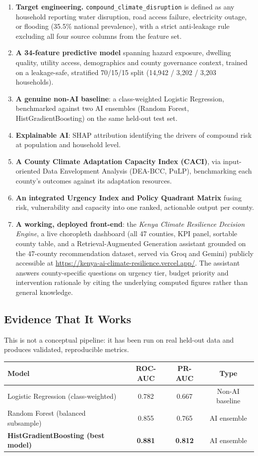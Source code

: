 \documentclass[12pt,a4paper]{article}
\begin{document}
\begin{enumerate}[leftmargin=1.2em, itemsep=1pt]
\item \textbf{Target engineering.} \texttt{compound\_climate\_disruption} is defined as any household reporting water disruption, road access failure, electricity outage, or flooding (35.5\% national prevalence), with a strict anti-leakage rule excluding all four source columns from the feature set.
\item \textbf{A 34-feature predictive model} spanning hazard exposure, dwelling quality, utility access, demographics and county governance context, trained on a leakage-safe, stratified 70/15/15 split (14,942 / 3,202 / 3,203 households).
\item \textbf{A genuine non-AI baseline}: a class-weighted Logistic Regression, benchmarked against two AI ensembles (Random Forest, HistGradientBoosting) on the same held-out test set.
\item \textbf{Explainable AI}: SHAP attribution identifying the drivers of compound risk at population and household level.
\item \textbf{A County Climate Adaptation Capacity Index (CACI)}, via input-oriented Data Envelopment Analysis (DEA-BCC, PuLP), benchmarking each county's outcomes against its adaptation resources.
\item \textbf{An integrated Urgency Index and Policy Quadrant Matrix} fusing risk, vulnerability and capacity into one ranked, actionable output per county.
\item \textbf{A working, deployed front-end}: the \emph{Kenya Climate Resilience Decision Engine}, a live choropleth dashboard (all 47 counties, KPI panel, sortable county table, and a Retrieval-Augmented Generation assistant grounded on the 47-county recommendation dataset, served via Groq and Gemini) publicly accessible at \url{https://kenya-ai-climate-resilience.vercel.app/}. The assistant answers county-specific questions on urgency tier, budget priority and intervention rationale by citing the underlying computed figures rather than general knowledge.
\end{enumerate}

\subsection{Evidence That It Works}
This is not a conceptual pipeline: it has been run on real held-out data and produces validated, reproducible metrics.

\begin{center}
\begin{tabular}{lccc}
\toprule
\textbf{Model} & \textbf{ROC-AUC} & \textbf{PR-AUC} & \textbf{Type} \\
\midrule
Logistic Regression (class-weighted) & 0.782 & 0.667 & Non-AI baseline \\
Random Forest (balanced subsample) & 0.855 & 0.765 & AI ensemble \\
\textbf{HistGradientBoosting (best model)} & \textbf{0.881} & \textbf{0.812} & AI ensemble \\
\bottomrule
\end{tabular}
\end{center}
\end{document}

